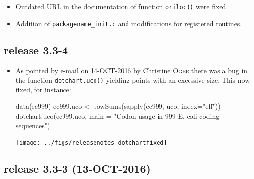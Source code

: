 \documentclass{article}
\begin{document}
\begin{itemize}

\item Outdated URL in the documentation of function \texttt{oriloc()} were fixed.

\item Addition of \texttt{packagename\_init.c} and modifications for registered routines.

\end{itemize}

\subsection*{release 3.3-4}

\begin{itemize}

\item As pointed by e-mail on 14-OCT-2016 by Christine \textsc{Oger} there was a bug in the function \texttt{dotchart.uco()} yielding points with an excessive size. This now fixed, for instance:

\begin{Schunk}
\begin{Sinput}
 data(ec999)
 ec999.uco <- rowSums(sapply(ec999, uco, index="eff"))
 dotchart.uco(ec999.uco, main = "Codon usage in 999 E. coli coding sequences")
\end{Sinput}
\end{Schunk}
\texttt{[image: ../figs/releasenotes-dotchartfixed]}

\end{itemize}

\subsection*{release 3.3-3 (13-OCT-2016)}
\end{document}
